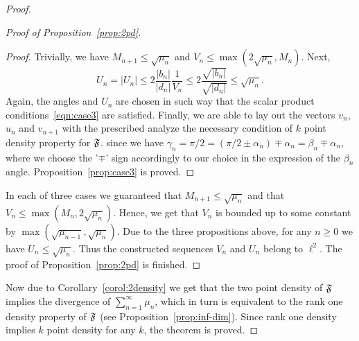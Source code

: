 \begin{proof}
\begin{proof}[Proof of Proposition~\ref{prop:2pd}]
\begin{proof}
            Trivially, we have $M_{n+1} \leq \sqrt{\mu_n}$ and $V_n \leq \max(2\sqrt{\mu_n}, M_n)$.
            Next,
            \[
              U_n = |U_n| \leq 2 \frac{|b_n|}{|d_n|} \frac{1}{V_n} \leq 2 \frac{\sqrt{|b_n|}}{\sqrt{|d_n|}} \leq \sqrt{\mu_n}.
            \]
            Again, the angles and $U_n$ are chosen in such way that the scalar product conditions~\eqref{eqn:case3} are satisfied.
            Finally, we are able to lay out the vectors $v_n$, $u_n$ and $v_{n+1}$ with the prescribed  analyze the necessary condition of $k$ point density property for $\mathfrak{F}$.
              since we have $\gamma_n = \pi/2 = (\pi/2 \pm \alpha_n) \mp \alpha_n = \beta_n \mp \alpha_n$,
              where we choose the '$\mp$' sign accordingly to our choice in the expression of the $\beta_n$ angle.
            Proposition~\ref{prop:case3} is proved.
          \end{proof}
        In each of three cases we guaranteed that $M_{n+1} \leq \sqrt{\mu_n}$ and that $V_n \leq \max(M_n, 2\sqrt{\mu_n})$.
        Hence, we get that $V_n$ is bounded up to some constant by $\max(\sqrt{\mu_{n-1}}, \sqrt{\mu_n})$.
        Due to the three propositions above, for any $n \geq 0$ we have $U_n \leq \sqrt{\mu_n}$.
        Thus the constructed sequences $V_n$ and $U_n$ belong to $\ell^2$.
        The proof of Proposition~\ref{prop:2pd} is finished.
      \end{proof}
      Now due to Corollary~\ref{corol:2density} we get that the two point density of $\mathfrak{F}$ implies the divergence of $\sum_{n=1}^\infty \mu_n$,
        which in turn is equivalent to the rank one density property of $\mathfrak{F}$ (see Proposition~\ref{prop:inf-dim}).
      Since rank one density implies $k$ point density for any $k$, the theorem is proved.
    \end{proof}
